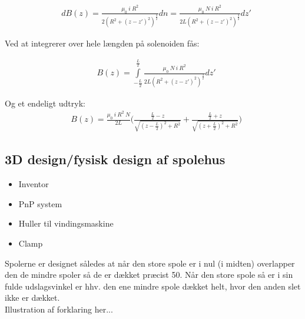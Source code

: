 \begin{align}
	&dB(z)=\frac{\mu_0 \: i \: R^2}{2(R^2+(z-z')^2)^\frac{3}{2}}dn=\frac{\mu_0 \: N \: i \: R^2}{2L(R^2+(z-z')^2)^\frac{3}{2}}dz'
\end{align}

Ved at integrerer over hele længden på solenoiden fås:

\begin{align}
	&B(z)=\int\limits_{-\frac{L}{2}}^{\frac{L}{2}}\frac{\mu_0 \: N \: i \: R^2}{2L(R^2+(z-z')^2)^\frac{3}{2}}dz'
\end{align}

Og et endeligt udtryk:
\begin{align}
	&B(z)= \frac{\mu_0 \: i \: R^2 \: N}{2L}\bigg(\frac{\frac{L}{2}-z}{\sqrt{(z-\frac{L}{2})^2+R^2}}+\frac{\frac{L}{2}+z}{\sqrt{(z+\frac{L}{2})^2+R^2}}\bigg)
\end{align}


%
%
%
%
%
%

\subsection{3D design/fysisk design af spolehus}
\begin{itemize}
	\item Inventor
	\item PnP system
	\item Huller til vindingsmaskine
	\item Clamp
\end{itemize}
Spolerne er designet således at når den store spole er i nul (i midten) overlapper den de mindre spoler så de er dækket præcist 50\percent. Når den store spole så er i sin fulde udslagsvinkel er hhv. den ene mindre spole dækket helt, hvor den anden slet ikke er dækket. \\

Illustration af forklaring her...

